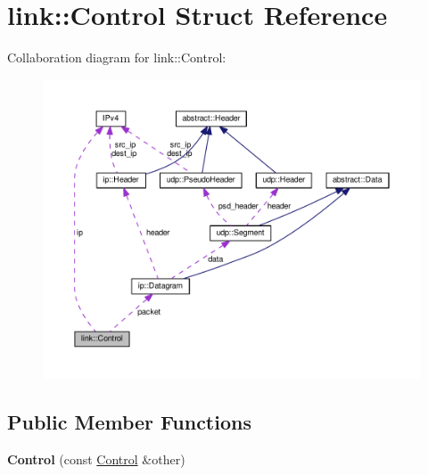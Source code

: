 \hypertarget{structlink_1_1Control}{}\section{link\+:\+:Control Struct Reference}
\label{structlink_1_1Control}


Collaboration diagram for link\+:\+:Control\+:
\nopagebreak
\begin{figure}[H]
\begin{center}
\leavevmode
\includegraphics[width=350pt]{structlink_1_1Control__coll__graph}
\end{center}
\end{figure}
\subsection*{Public Member Functions}
\begin{DoxyCompactItemize}
\item 
{\bfseries Control} (const \hyperlink{structlink_1_1Control}{Control} \&other)\hypertarget{structlink_1_1Control_af69072be879940dcb70c80cc40f2e46a}{}\label{structlink_1_1Control_af69072be879940dcb70c80cc40f2e46a}

\end{DoxyCompactItemize}
